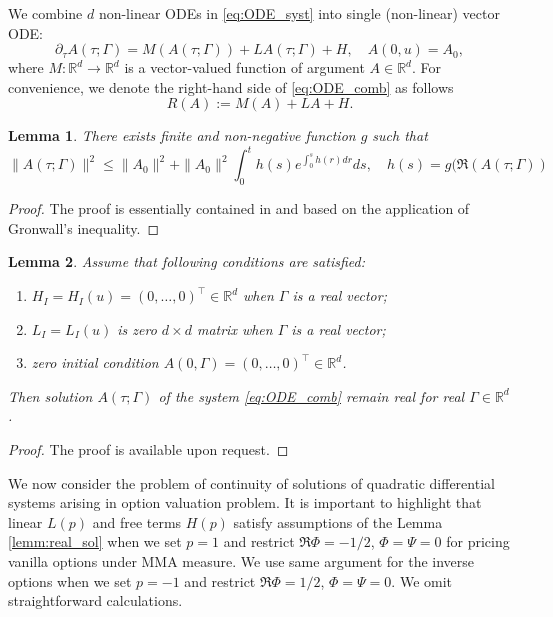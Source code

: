 \documentclass[pdftex,11pt,a4paper] {article}
\newtheorem{lemma}{Lemma}[section]
\begin{document}
We combine $d$ non-linear ODEs in \eqref{eq:ODE_syst} into single (non-linear) vector ODE:
\begin{equation}\label{eq:ODE_comb}
\partial_{\tau} A(\tau; \Gamma)=M(A(\tau; \Gamma))+LA(\tau; \Gamma)+H,\quad A(0,u)=A_0,
\end{equation}
where $M:\mathbb{R}^d\to\mathbb{R}^d$ is a vector-valued function of argument $A\in\mathbb{R}^d$. For convenience, we denote the right-hand side of \eqref{eq:ODE_comb} as follows
\begin{equation}
R(A):=M(A)+LA+H.
\end{equation} 


\begin{lemma}\label{lemm:bound2}
There exists finite and non-negative function $g$ such that
\begin{equation}
\|A(\tau; \Gamma)\|^2\le \|A_0\|^2+\|A_0\|^2 \int_0^t h(s)e^{\int_0^s h(r)dr}ds,\quad h(s)=g(\Re(A(\tau; \Gamma))
\end{equation}
\end{lemma}
\begin{proof}
The proof is essentially contained in \cite{Mayerhofer2015} and based on the application of Gronwall's inequality. 
\end{proof}



\begin{lemma}\label{lemm:real_sol}
Assume that following conditions are satisfied:
\begin{enumerate}%
\item\label{assump:zero_im_freeterm} $H_I=H_I(u)=(0,\ldots,0)^\top \in \mathbb{R}^d$ when $\Gamma$ is a real vector;
\item\label{assump:zero_im_linterm} $L_I=L_I(u)$ is zero $d\times d$ matrix when $\Gamma$ is a real vector;
\item\label{assump:zero_init_cond} zero initial condition $A(0,\Gamma)=(0,\ldots,0)^\top \in \mathbb{R}^d$.
\end{enumerate}
Then solution $A(\tau; \Gamma)$ of the system \eqref{eq:ODE_comb} remain real for real $\Gamma\in\mathbb{R}^d$. 
\end{lemma}
\begin{proof}
The proof is available upon request.
\end{proof}


We now consider the problem of continuity of solutions of quadratic differential systems arising in option valuation problem. It is important to highlight that linear $L(p)$ and free terms $H(p)$ satisfy assumptions of the Lemma \eqref{lemm:real_sol} when we set $p=1$ and restrict $\Re \Phi=-1/2$, $\Phi=\Psi=0$ for pricing vanilla options under MMA measure. We use same argument  for the inverse options when we set $p=-1$ and restrict $\Re \Phi=1/2$, $\Phi=\Psi=0$. We omit straightforward calculations. 
\end{document}
